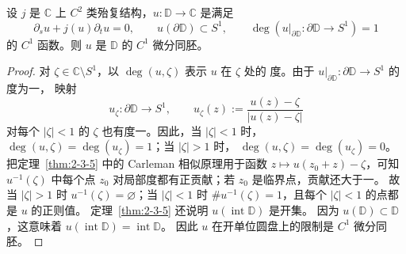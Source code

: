 \begin{lemma}\label{lem:C-5-7}
设 $j$ 是 $\mathbb C$ 上 $C^2$ 类殆复结构，$u:\mathbb D\to\mathbb C$
是满足
\begin{equation}\label{eq:C-5-7}
  \partial_su+j(u)\partial_tu=0,\qquad
  u(\partial\mathbb D)\subset S^1,\qquad
  \deg(u|_{\partial\mathbb D}:\partial\mathbb D\to S^1)=1
\end{equation}
的 $C^1$ 函数。则 $u$ 是 $\mathbb D$ 的 $C^1$ 微分同胚。
\end{lemma}

\begin{proof}
对 $\zeta\in\mathbb C\setminus S^1$，以 $\deg(u,\zeta)$ 表示 $u$ 在 $\zeta$ 处的
度。由于 $u|_{\partial\mathbb D}:\partial\mathbb D\to S^1$ 的度为一，
映射
\[
  u_\zeta:\partial\mathbb D\to S^1,\qquad
  u_\zeta(z):=\frac{u(z)-\zeta}{|u(z)-\zeta|}
\]
对每个 $|\zeta|<1$ 的 $\zeta$ 也有度一。因此，当 $|\zeta|<1$ 时，
$\deg(u,\zeta)=\deg(u_\zeta)=1$；当 $|\zeta|>1$ 时，
$\deg(u,\zeta)=\deg(u_\zeta)=0$。
把定理~\ref{thm:2-3-5} 中的 Carleman 相似原理用于函数
$z\mapsto u(z_0+z)-\zeta$，可知 $u^{-1}(\zeta)$ 中每个点 $z_0$
对局部度都有正贡献；若 $z_0$ 是临界点，贡献还大于一。
故当 $|\zeta|>1$ 时 $u^{-1}(\zeta)=\varnothing$；当 $|\zeta|<1$ 时
$\#u^{-1}(\zeta)=1$，且每个 $|\zeta|<1$ 的点都是 $u$ 的正则值。
定理~\ref{thm:2-3-5} 还说明 $u(\operatorname{int}\mathbb D)$ 是开集。
因为 $u(\mathbb D)\subset\mathbb D$，这意味着
$u(\operatorname{int}\mathbb D)=\operatorname{int}\mathbb D$。
因此 $u$ 在开单位圆盘上的限制是 $C^1$ 微分同胚。


\end{proof}
